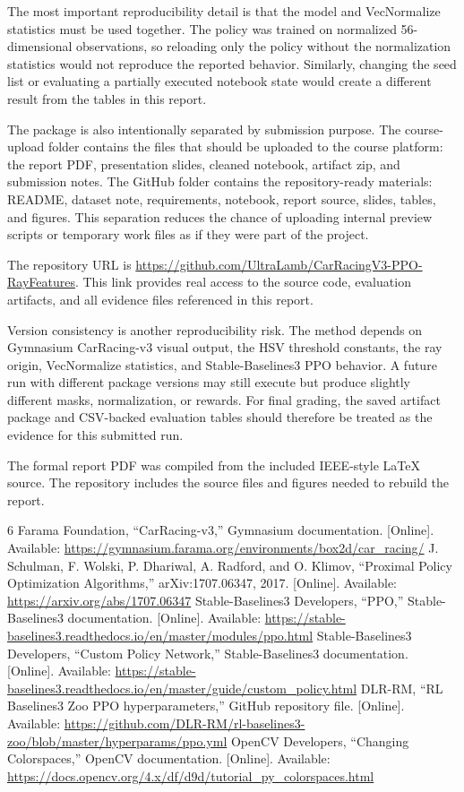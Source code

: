\documentclass[conference]{IEEEtran}
\begin{document}
The most important reproducibility detail is that the model and VecNormalize statistics must be used together. The policy was trained on normalized 56-dimensional observations, so reloading only the policy without the normalization statistics would not reproduce the reported behavior. Similarly, changing the seed list or evaluating a partially executed notebook state would create a different result from the tables in this report.

The package is also intentionally separated by submission purpose. The course-upload folder contains the files that should be uploaded to the course platform: the report PDF, presentation slides, cleaned notebook, artifact zip, and submission notes. The GitHub folder contains the repository-ready materials: README, dataset note, requirements, notebook, report source, slides, tables, and figures. This separation reduces the chance of uploading internal preview scripts or temporary work files as if they were part of the project.

The repository URL is \url{https://github.com/UltraLamb/CarRacingV3-PPO-RayFeatures}. This link provides real access to the source code, evaluation artifacts, and all evidence files referenced in this report.

Version consistency is another reproducibility risk. The method depends on Gymnasium CarRacing-v3 visual output, the HSV threshold constants, the ray origin, VecNormalize statistics, and Stable-Baselines3 PPO behavior. A future run with different package versions may still execute but produce slightly different masks, normalization, or rewards. For final grading, the saved artifact package and CSV-backed evaluation tables should therefore be treated as the evidence for this submitted run.

The formal report PDF was compiled from the included IEEE-style LaTeX source. The repository includes the source files and figures needed to rebuild the report.

\begin{thebibliography}{6}
 Farama Foundation, ``CarRacing-v3,'' Gymnasium documentation. [Online]. Available: \url{https://gymnasium.farama.org/environments/box2d/car_racing/}
 J. Schulman, F. Wolski, P. Dhariwal, A. Radford, and O. Klimov, ``Proximal Policy Optimization Algorithms,'' arXiv:1707.06347, 2017. [Online]. Available: \url{https://arxiv.org/abs/1707.06347}
 Stable-Baselines3 Developers, ``PPO,'' Stable-Baselines3 documentation. [Online]. Available: \url{https://stable-baselines3.readthedocs.io/en/master/modules/ppo.html}
 Stable-Baselines3 Developers, ``Custom Policy Network,'' Stable-Baselines3 documentation. [Online]. Available: \url{https://stable-baselines3.readthedocs.io/en/master/guide/custom_policy.html}
 DLR-RM, ``RL Baselines3 Zoo PPO hyperparameters,'' GitHub repository file. [Online]. Available: \url{https://github.com/DLR-RM/rl-baselines3-zoo/blob/master/hyperparams/ppo.yml}
 OpenCV Developers, ``Changing Colorspaces,'' OpenCV documentation. [Online]. Available: \url{https://docs.opencv.org/4.x/df/d9d/tutorial_py_colorspaces.html}
\end{thebibliography}
\end{document}
